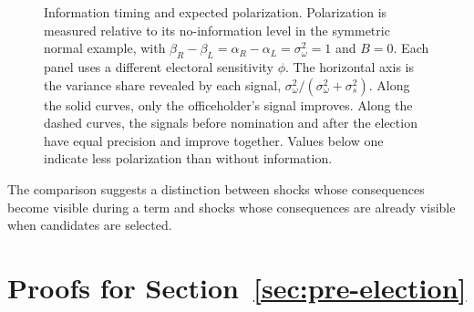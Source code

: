 \documentclass[12pt,letterpaper]{article}
\begin{document}
\begin{figure}[t]
\begin{subfigure}[b]{0.31\linewidth}
\end{subfigure}
\caption{Information timing and expected polarization. Polarization is measured relative to its no-information level in the symmetric normal example, with $\beta_R-\beta_L=\alpha_R-\alpha_L=\sigma_\omega^2=1$ and $B=0$. Each panel uses a different electoral sensitivity $\phi$. The horizontal axis is the variance share revealed by each signal, $\sigma_\omega^2/(\sigma_\omega^2+\sigma_s^2)$. Along the solid curves, only the officeholder's signal improves. Along the dashed curves, the signals before nomination and after the election have equal precision and improve together. Values below one indicate less polarization than without information.}
\label{fig:sticky}
\end{figure}

The comparison suggests a distinction between shocks whose consequences become visible during a term and shocks whose consequences are already visible when candidates are selected.


\section{Proofs for Section~\ref{sec:pre-election}}
\end{document}
